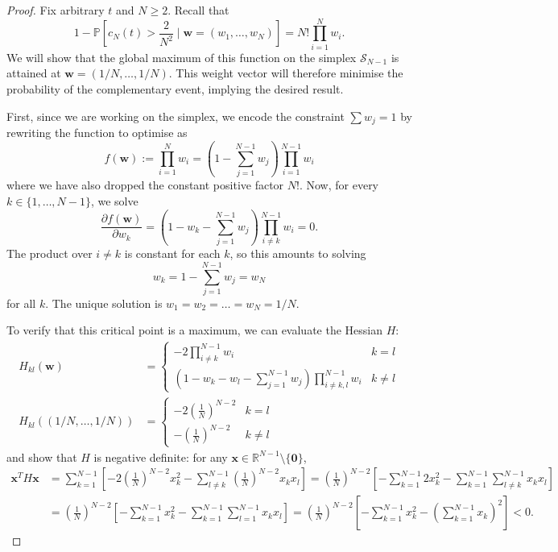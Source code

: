 \documentclass{article}
\newcommand{\PR}{\mathbb{P}}
\begin{document}
\begin{proof}
Fix arbitrary $t$ and $N\geq 2$. Recall that
\begin{equation}\label{eq:mn_nomerger_prob}
1-\PR \left[c_N(t) > \frac{2}{N^2} \mid \mathbf{w}=(w_1, \dots, w_N) \right]
= N! \prod_{i=1}^N w_i .
\end{equation}
We will show that the global maximum of this function on the simplex $\mathcal{S}_{N-1}$ is attained at $\mathbf{w}=(1/N,\dots,1/N)$.
This weight vector will therefore minimise the probability of the complementary event, implying the desired result.

First, since we are working on the simplex, we encode the constraint $\sum w_j =1$ by rewriting the function to optimise as
\begin{equation*}
f(\mathbf{w}) :=
\prod_{i=1}^N w_i
= \left(1- \sum_{j=1}^{N-1} w_j \right)\prod_{i=1}^{N-1} w_i 
\end{equation*}
where we have also dropped the constant positive factor $N!$. 
Now, for every $k \in \{1,\dots,N-1\}$, we solve
\begin{equation*}
\frac{\partial f(\mathbf{w})}{\partial w_k}
= \left(1- w_k - \sum_{j=1}^{N-1} w_j \right)\prod_{i\neq k}^{N-1} w_i 
=0 .
\end{equation*}
The product over $i \neq k$ is constant for each $k$, so this amounts to solving
\begin{equation*}
w_k = 1- \sum_{j=1}^{N-1} w_j = w_N
\end{equation*}
for all $k$.
The unique solution is
$w_1 = w_2= \dots =  w_N = 1/N$.

To verify that this critical point is a maximum, we can evaluate the Hessian $H$:
\begin{align*}
H_{kl}(\mathbf{w})
&= \begin{cases}
-2 \prod_{i\neq k}^{N-1} w_i & k=l \\
\left( 1 - w_k - w_l - \sum_{j=1}^{N-1} w_j \right)\prod_{i\neq k,l}^{N-1}w_i & k\neq l
\end{cases} \\
H_{kl}((1/N, \dots, 1/N))&= \begin{cases}
-2 \left(\frac{1}{N}\right)^{N-2} & k=l \\
- \left(\frac{1}{N}\right)^{N-2} & k\neq l
\end{cases}
\end{align*}
and show that $H$ is negative definite: for any $\mathbf{x} \in \mathbb{R}^{N-1} \setminus \{\mathbf{0}\}$,
\begin{align*}
\mathbf{x}^T H \mathbf{x} &= \sum_{k=1}^{N-1} \left[ -2\left(\frac{1}{N}\right)^{N-2} x_k^2
- \sum_{l\neq k}^{N-1} \left(\frac{1}{N}\right)^{N-2} x_k x_l \right] 
= \left(\frac{1}{N}\right)^{N-2} \left[ -\sum_{k=1}^{N-1} 2x_k^2 - \sum_{k=1}^{N-1} \sum_{l\neq k}^{N-1} x_k x_l \right] \\
&= \left(\frac{1}{N}\right)^{N-2} \left[ -\sum_{k=1}^{N-1} x_k^2 - \sum_{k=1}^{N-1} \sum_{l=1}^{N-1} x_k x_l \right]
= \left(\frac{1}{N}\right)^{N-2} \left[ - \sum_{k=1}^{N-1} x_k^2 - \left(\sum_{k=1}^{N-1} x_k \right)^2 \right]
< 0 .
\end{align*}
\end{proof}
\end{document}
